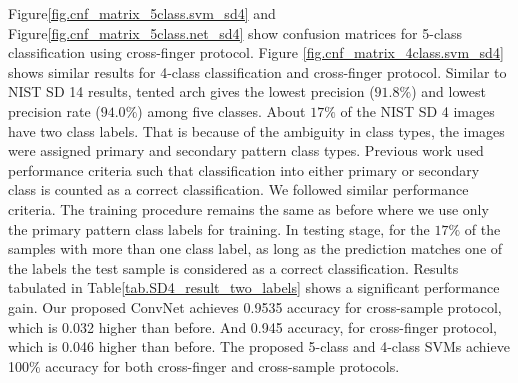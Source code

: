 Figure\ref{fig.cnf_matrix_5class.svm_sd4} and Figure\ref{fig.cnf_matrix_5class.net_sd4} show confusion matrices for 5-class classification using cross-finger protocol. Figure \ref{fig.cnf_matrix_4class.svm_sd4} shows similar results for 4-class classification and cross-finger protocol.
%
Similar to NIST SD 14 results, tented arch gives the lowest precision ($91.8\%$) and lowest precision rate ($94.0\%$) among five classes. 
%
About $17\%$ of the NIST SD 4 images have two class labels.  That is because of the ambiguity in class types, the images were assigned  primary and secondary pattern class types. Previous work used performance criteria such that classification into either primary or secondary class is counted as a correct classification. We followed similar performance criteria.
%
%
%
%
The training procedure remains the same as before where we use only the primary pattern class labels for training. 
%
In testing stage, for the $17\%$ of the samples with more than one class label, as long as the prediction matches one of the labels the test sample is considered as a correct classification.  Results tabulated in Table\ref{tab.SD4_result_two_labels} shows a significant performance gain. 
Our proposed ConvNet achieves 0.9535 accuracy for cross-sample protocol, which is 0.032 higher than before.  And 0.945 accuracy, for cross-finger protocol, which is 0.046 higher than before.
%
The proposed 5-class and 4-class SVMs achieve 100\% accuracy for both cross-finger and cross-sample protocols.
%

%


